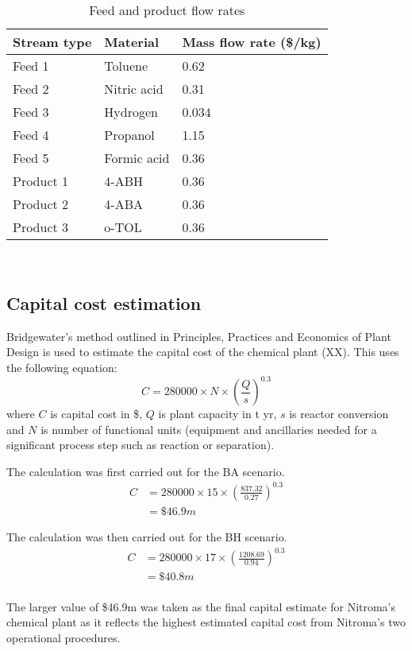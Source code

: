\begin{table}[h] 
\centering
\caption{Feed and product flow rates}
\label{tab:costing-flows}
\begin{tabular}{lll}
    \toprule
    Stream type    & Material    & Mass flow rate (\$/kg) \\\midrule
    Feed 1     & Toluene     & 0.62                     \\
    Feed 2     & Nitric acid & 0.31                      \\
    Feed 3     & Hydrogen    & 0.034                     \\
    Feed 4     & Propanol    & 1.15                      \\
    Feed 5     & Formic acid & 0.36                      \\ 
    Product 1  & 4-ABH       & 0.36                      \\
    Product 2  & 4-ABA       & 0.36                      \\
    Product 3  & o-TOL       & 0.36                      \\\bottomrule
\end{tabular}
\end{table}
\\

\subsection{Capital cost estimation}

Bridgewater's method outlined in Principles, Practices and Economics of Plant Design is used to estimate the capital cost of the chemical plant (XX). This uses the following equation:
\begin{equation}
    C= \num{280000} \times N \times \left(\frac{Q}{s}\right)^{0.3}
\end{equation}
where $C$ is capital cost in \$, $Q$ is  plant capacity in t yr, $s$ is reactor conversion and $N$ is number of functional units (equipment and ancillaries needed for a significant process step such as reaction or separation).

The calculation was first carried out for the BA scenario.
\begin{align*}
C &= \num{280000} \times 15 \times \left(\frac{837.32}{0.27}\right)^{0.3}  \\
  &= \$46.9m 
\end{align*}

The calculation was then carried out for the BH scenario.
\begin{align*}
C &= 280000 \times 17 \times \left(\frac{1208.69}{0.94}\right)^{0.3}  \\
  &=\$40.8m 
\end{align*}
\\
The larger value of \$46.9m was taken as the final capital estimate for Nitroma's chemical plant as it reflects the highest estimated capital cost from Nitroma's two operational procedures.